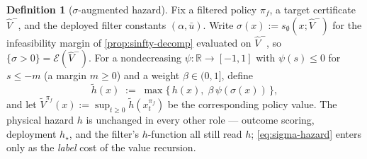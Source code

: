 \documentclass[11pt]{article}
\theoremstyle{plain}
\theoremstyle{definition}
\newtheorem{definition}[theorem]{Definition}
\theoremstyle{remark}
\newcommand{\R}{\mathbb{R}}
\newcommand{\Vhat}{\widehat V}
\newcommand{\eqdef}{:=}
\begin{document}
\begin{definition}[$\sigma$-augmented hazard]\label{def:sigma-hazard}
Fix a filtered policy $\pi_f$, a target certificate $\Vhat^-$, and the deployed filter
constants $(\alpha,\bar u)$. Write $\sigma(x)\eqdef s_\emptyset(x;\Vhat^-)$ for the
infeasibility margin of \cref{prop:sinfty-decomp} evaluated on $\Vhat^-$, so
$\{\sigma>0\}=\mathcal E(\Vhat^-)$. For a nondecreasing $\psi:\R\to[-1,1]$ with
$\psi(s)\le0$ for $s\le-m$ (a margin $m\ge0$) and a weight $\beta\in(0,1]$, define
\begin{equation}\label{eq:sigma-hazard}
  \tilde h(x)\;\eqdef\;\max\bigl\{\,h(x),\;\beta\,\psi(\sigma(x))\,\bigr\},
\end{equation}
and let $\tilde V^{\pi_f}(x)\eqdef\sup_{t\ge0}\tilde h(x^{\pi_f}_t)$ be the corresponding
policy value. The physical hazard $h$ is unchanged in every other role --- outcome scoring,
deployment $h_\star$, and the filter's $h$-function all still read $h$; \eqref{eq:sigma-hazard}
enters only as the \emph{label} cost of the value recursion.
\end{definition}
\end{document}
